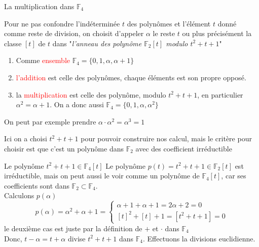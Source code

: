 
\begin{parag}{La multiplication dans $\mathbb{F}_4$}
    
        Pour ne pas confondre l'indéterminée $t$ des polynômes et l'élément $t$ donné comme reste de division, on choisit d'appeler $\alpha$ le reste $t$ ou plus précisément la classe $[t]$ de $t$ dans "\textit{l'anneau des polynôme $\mathbb{F}_2[t]$ modulo $t^2 + t + 1$}"
        \begin{enumerate}
            \item Comme \textcolor{red}{ensemble} $\mathbb{F}_4 = \{0, 1, \alpha, \alpha + 1\}$
            \item \textcolor{red}{l'addition} est celle des polynômes, chaque éléments est son propre opposé.
            \item la \textcolor{red}{multiplication} est celle des polynôme, modulo $t^2 + t + 1$, en particulier $\alpha^2 = \alpha + 1$. On a donc aussi $\mathbb{F}_4 = \{0, 1, \alpha, \alpha^2\}$   
        \end{enumerate}
        On peut par exemple prendre $\alpha \cdot \alpha^2 = \alpha^3 = 1$
        \begin{framedremark}
            Ici on a choisi $t^2 + t + 1$ pour pouvoir construire nos calcul, mais le critère pour choisir est que c'est un polynôme dans $\mathbb{F}_2$ avec des coefficient irréductible
        \end{framedremark}
        \begin{subparag}{Le polynôme $t^2 + t + 1 \in \mathbb{F}_4[t]$}
            Le polynôme $p(t) = t^2 + t + 1 \in \mathbb{F}_2[t]$ est irréductible, mais on peut aussi le voir comme un polynôme de $\mathbb{F}_4[t]$, car ses coefficients sont dans $\mathbb{F}_2 \subset \mathbb{F}_4$.
            \\
            Calculons $p(\alpha)$
            \[p(\alpha) = \alpha^2 + \alpha + 1 = \begin{cases}
                \alpha + 1  + \alpha + 1 = 2\alpha + 2  = 0\\
                [t]^2 + [t] + 1  = [t^2 + t + 1] = 0
            \end{cases}\]
            le deuxième cas est juste par la définition de $+$ et $\cdot $ dans $\mathbb{F}_4$\\
            Donc, $t-\alpha = t + \alpha$ divise $t^2 + t + 1$ dans $\mathbb{F}_4$. Effectuons la divisions euclidienne.
            

\end{subparag}
\end{parag}
